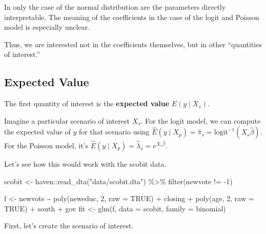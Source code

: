 \documentclass[
]{book}
\newenvironment{Shaded}{\begin{snugshade}}{\end{snugshade}}
\newcommand{\AttributeTok}[1]{\textcolor[rgb]{0.77,0.63,0.00}{#1}}
\newcommand{\ConstantTok}[1]{\textcolor[rgb]{0.00,0.00,0.00}{#1}}
\newcommand{\DecValTok}[1]{\textcolor[rgb]{0.00,0.00,0.81}{#1}}
\newcommand{\FunctionTok}[1]{\textcolor[rgb]{0.00,0.00,0.00}{#1}}
\newcommand{\NormalTok}[1]{#1}
\newcommand{\OtherTok}[1]{\textcolor[rgb]{0.56,0.35,0.01}{#1}}
\newcommand{\SpecialCharTok}[1]{\textcolor[rgb]{0.00,0.00,0.00}{#1}}
\newcommand{\StringTok}[1]{\textcolor[rgb]{0.31,0.60,0.02}{#1}}
\begin{document}
In only the case of the normal distribution are the parameters directly
interpretable. The meaning of the coefficients in the case of the logit
and Poisson model is especially unclear.

Thus, we are interested not in the coefficients themselves, but in other
``quantities of interest.''

\hypertarget{expected-value}{%
\subsection{Expected Value}\label{expected-value}}

The first quantity of interest is the \textbf{expected value}
\(E(y \mid X_s)\).

Imagine a particular scenario of interest \(X_s\). For the logit model,
we can compute the expected value of \(y\) for that scenario using
\(\hat{E}(y \mid X_p) = \hat{\pi}_s = \text{logit}^{-1}(X_s\hat{\beta})\).
For the Poisson model, it's
\(\hat{E}(y \mid X_p) = \hat{\lambda}_s = e^{X_s\hat{\beta}}\).

Let's see how this would work with the scobit data.

\begin{Shaded}
\begin{Highlighting}[]
\NormalTok{scobit }\OtherTok{\textless{}{-}}\NormalTok{ haven}\SpecialCharTok{::}\FunctionTok{read\_dta}\NormalTok{(}\StringTok{"data/scobit.dta"}\NormalTok{) }\SpecialCharTok{\%\textgreater{}\%}
  \FunctionTok{filter}\NormalTok{(newvote }\SpecialCharTok{!=} \SpecialCharTok{{-}}\DecValTok{1}\NormalTok{) }

\NormalTok{f }\OtherTok{\textless{}{-}}\NormalTok{ newvote }\SpecialCharTok{\textasciitilde{}} \FunctionTok{poly}\NormalTok{(neweduc, }\DecValTok{2}\NormalTok{, }\AttributeTok{raw =} \ConstantTok{TRUE}\NormalTok{) }\SpecialCharTok{+}\NormalTok{ closing }\SpecialCharTok{+} \FunctionTok{poly}\NormalTok{(age, }\DecValTok{2}\NormalTok{, }\AttributeTok{raw =} \ConstantTok{TRUE}\NormalTok{) }\SpecialCharTok{+}\NormalTok{ south }\SpecialCharTok{+}\NormalTok{ gov}
\NormalTok{fit }\OtherTok{\textless{}{-}} \FunctionTok{glm}\NormalTok{(f, }\AttributeTok{data =}\NormalTok{ scobit, }\AttributeTok{family =}\NormalTok{ binomial)}
\end{Highlighting}
\end{Shaded}

First, let's create the scenario of interest.
\end{document}
